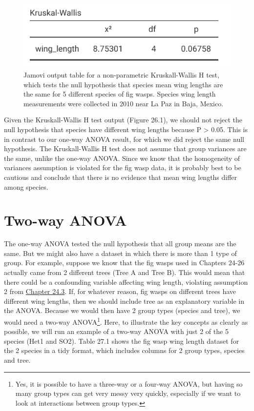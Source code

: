 \documentclass[
  openany]{krantz}
\begin{document}
\begin{figure}
\includegraphics[width=0.6\linewidth]{img/jamovi_kruskall-wallis_test} \caption{Jamovi output table for a non-parametric Kruskall-Wallis H test, which tests the null hypothesis that species mean wing lengths are the same for 5 different species of fig wasps. Species wing length measurements were collected in 2010 near La Paz in Baja, Mexico.}\label{fig:unnamed-chunk-105}
\end{figure}

Given the Kruskall-Wallis H test output (Figure 26.1), we should not reject the null hypothesis that species have different wing lengths because P \textgreater{} 0.05.
This is in contrast to our one-way ANOVA result, for which we did reject the same null hypothesis.
The Kruskall-Wallis H test does not assume that group variances are the same, unlike the one-way ANOVA.
Since we know that the homogeneity of variances assumption is violated for the fig wasp data, it is probably best to be cautious and conclude that there is no evidence that mean wing lengths differ among species.

\hypertarget{Chapter_27}{%
\chapter{Two-way ANOVA}\label{Chapter_27}}

The one-way ANOVA tested the null hypothesis that all group means are the same.
But we might also have a dataset in which there is more than 1 type of group.
For example, suppose we know that the fig wasps used in Chapters 24-26 actually came from 2 different trees (Tree A and Tree B).
This would mean that there could be a confounding variable affecting wing length, violating assumption 2 from \protect\hyperlink{assumptions-of-anova}{Chapter 24.3}.
If, for whatever reason, fig wasps on different trees have different wing lengths, then we should include tree as an explanatory variable in the ANOVA.
Because we would then have 2 group types (species and tree), we would need a two-way ANOVA\footnote{Yes, it is possible to have a three-way or a four-way ANOVA, but having so many group types can get very messy very quickly, especially if we want to look at interactions between group types.}.
Here, to illustrate the key concepts as clearly as possible, we will run an example of a two-way ANOVA with just 2 of the 5 species (Het1 and SO2).
Table 27.1 shows the fig wasp wing length dataset for the 2 species in a tidy format, which includes columns for 2 group types, species and tree.
\end{document}
